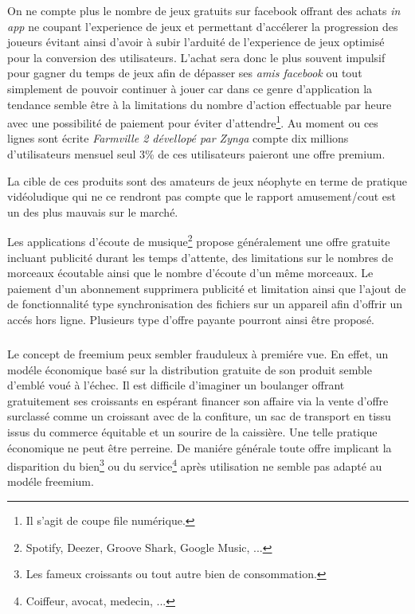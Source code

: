 \documentclass[11pt, a4paper ]{article}
\begin{document}
On ne compte plus le nombre de jeux gratuits sur facebook offrant des achats \emph{in app} ne coupant l'experience de jeux et permettant d'accélerer la progression des joueurs évitant ainsi d'avoir à subir l'arduité de l'experience de jeux optimisé pour la conversion des utilisateurs. L'achat sera donc le plus souvent impulsif pour gagner du temps de jeux afin de dépasser ses \emph{amis facebook} ou tout simplement de pouvoir continuer à jouer car dans ce genre d'application la tendance semble être à la limitations du nombre d'action effectuable par heure avec une possibilité de paiement pour éviter d'attendre\footnote{Il s'agit de coupe file numérique.}. Au moment ou ces lignes sont écrite \emph{Farmville 2 dévellopé par Zynga} compte dix millions d'utilisateurs mensuel seul 3\% de ces utilisateurs paieront une offre premium.


La cible de ces produits sont des amateurs de jeux néophyte en terme de pratique vidéoludique qui ne ce rendront pas compte que le rapport amusement/cout est un des plus mauvais sur le marché.

\subsubparagraph{}
Les applications d'écoute de musique\footnote{Spotify, Deezer, Groove Shark, Google Music, ...} propose généralement une offre gratuite incluant publicité durant les temps d'attente, des limitations sur le nombres de morceaux écoutable ainsi que le nombre d'écoute d'un même morceaux.
Le paiement d'un abonnement supprimera publicité et limitation ainsi que l'ajout de de fonctionnalité type synchronisation des fichiers sur un appareil afin d'offrir un accés hors ligne. Plusieurs type d'offre payante pourront ainsi être proposé.


\paragraph{} %
	\subparagraph{} %
Le concept de freemium peux sembler frauduleux à premiére vue. En effet, un modéle économique basé sur la distribution gratuite de son produit semble d'emblé voué à l'échec. Il est difficile d'imaginer un boulanger offrant gratuitement ses croissants en espérant financer son affaire via la vente d'offre surclassé comme un croissant avec de la confiture, un sac de transport en tissu issus du commerce équitable et un sourire de la caissière. Une telle pratique économique ne peut être perreine. De maniére générale toute offre implicant la disparition du bien\footnote{Les fameux croissants ou tout autre bien de consommation.} ou du service\footnote{Coiffeur, avocat, medecin, ...} après utilisation ne semble pas adapté au modéle freemium.
\end{document}
